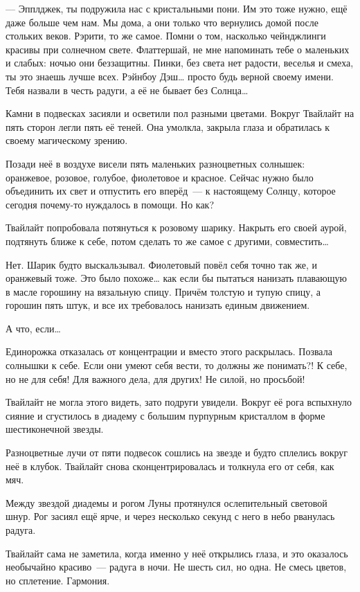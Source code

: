 \documentclass[twoside,a5paper,12pt]{extbook}
\begin{document}
— Эпплджек, ты подружила нас с кристальными пони. Им это тоже нужно, ещё даже больше чем нам. Мы дома, а они только что вернулись домой после стольких веков. Рэрити, то же самое. Помни о том, насколько чейнджлинги красивы при солнечном свете. Флаттершай, не мне напоминать тебе о маленьких и слабых: ночью они беззащитны. Пинки, без света нет радости, веселья и смеха, ты это знаешь лучше всех. Рэйнбоу Дэш… просто будь верной своему имени. Тебя назвали в честь радуги, а её не бывает без Солнца…

Камни в подвесках засияли и осветили пол разными цветами. Вокруг Твайлайт на пять сторон легли пять её теней. Она умолкла, закрыла глаза и обратилась к своему магическому зрению.

Позади неё в воздухе висели пять маленьких разноцветных солнышек: оранжевое, розовое, голубое, фиолетовое и красное. Сейчас нужно было объединить их свет и отпустить его вперёд — к настоящему Солнцу, которое сегодня почему-то нуждалось в помощи. Но как?

Твайлайт попробовала потянуться к розовому шарику. Накрыть его своей аурой, подтянуть ближе к себе, потом сделать то же самое с другими, совместить…

Нет. Шарик будто выскальзывал. Фиолетовый повёл себя точно так же, и оранжевый тоже. Это было похоже… как если бы пытаться нанизать плавающую в масле горошину на вязальную спицу. Причём толстую и тупую спицу, а горошин пять штук, и все их требовалось нанизать единым движением.

А что, если…

Единорожка отказалась от концентрации и вместо этого раскрылась. Позвала солнышки к себе. Если они умеют себя вести, то должны же понимать?! К себе, но не для себя! Для важного дела, для других! Не силой, но просьбой!

Твайлайт не могла этого видеть, зато подруги увидели. Вокруг её рога вспыхнуло сияние и сгустилось в диадему с большим пурпурным кристаллом в форме шестиконечной звезды.

Разноцветные лучи от пяти подвесок сошлись на звезде и будто сплелись вокруг неё в клубок. Твайлайт снова сконцентрировалась и толкнула его от себя, как мяч.

Между звездой диадемы и рогом Луны протянулся ослепительный световой шнур. Рог засиял ещё ярче, и через несколько секунд с него в небо рванулась радуга.

Твайлайт сама не заметила, когда именно у неё открылись глаза, и это оказалось необычайно красиво — радуга в ночи. Не шесть сил, но одна. Не смесь цветов, но сплетение. Гармония.
\end{document}
